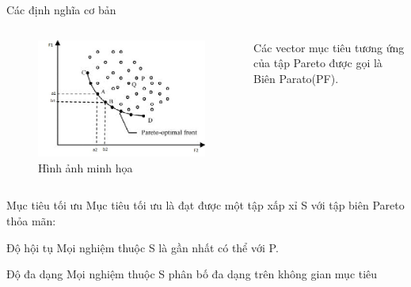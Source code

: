 \documentclass{beamer}
\begin{document}
    \begin{frame}{Các định nghĩa cơ bản}
        \begin{columns}
        \begin{figure}
            \centering
            \includegraphics[scale = 0.5]{paretofront.jpg}
            \caption{Hình ảnh minh họa}
            \label{fig:my_label}
        \end{figure}
        Các vector mục tiêu tương ứng của tập Pareto được gọi là Biên Parato(PF).
        \end{columns}
    \end{frame}
    \begin{frame}{Mục tiêu tối ưu}
        Mục tiêu tối ưu là đạt được một tập xấp xỉ S với tập biên Pareto thỏa mãn:
        \pause
        \begin{block}{Độ hội tụ}
            Mọi nghiệm thuộc S là gần nhất có thể với P.
            \end{block}
        \pause
        \begin{block}{Độ đa dạng}
        Mọi nghiệm thuộc S phân bố đa dạng trên không gian mục tiêu
        \end{block}
    \end{frame}
\end{document}
